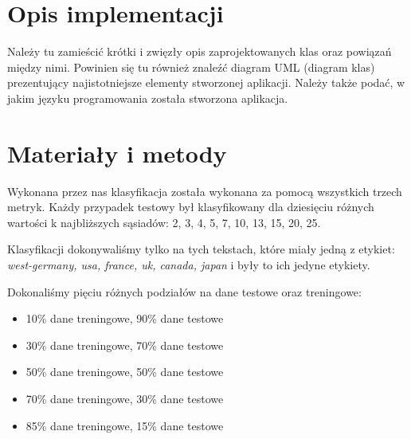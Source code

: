 \documentclass{classrep}
\begin{document}
\begin{enumerate}

\end{enumerate}





\section{Opis implementacji} %
{\color{blue}
Należy tu zamieścić krótki i zwięzły opis zaprojektowanych klas oraz powiązań
między nimi. Powinien się tu również znaleźć diagram UML  (diagram klas)
prezentujący najistotniejsze elementy stworzonej aplikacji. Należy także
podać, w jakim języku programowania została stworzona aplikacja. }

\section{Materiały i metody} %
Wykonana przez nas klasyfikacja została wykonana za pomocą wszystkich trzech metryk. Każdy przypadek testowy był klasyfikowany dla dziesięciu różnych wartości k najbliższych sąsiadów: 2, 3, 4, 5, 7, 10, 13, 15, 20, 25.

Klasyfikacji dokonywaliśmy tylko na tych tekstach, które miały jedną z etykiet: \textsl{west-germany, usa, france, uk, canada, japan} i były to ich jedyne etykiety.

Dokonaliśmy pięciu różnych podziałów na dane testowe oraz treningowe:
\begin{itemize}
\item 10\% dane treningowe, 90\% dane testowe
\item 30\% dane treningowe, 70\% dane testowe
\item 50\% dane treningowe, 50\% dane testowe
\item 70\% dane treningowe, 30\% dane testowe
\item 85\% dane treningowe, 15\% dane testowe
\end{itemize}
\end{document}
